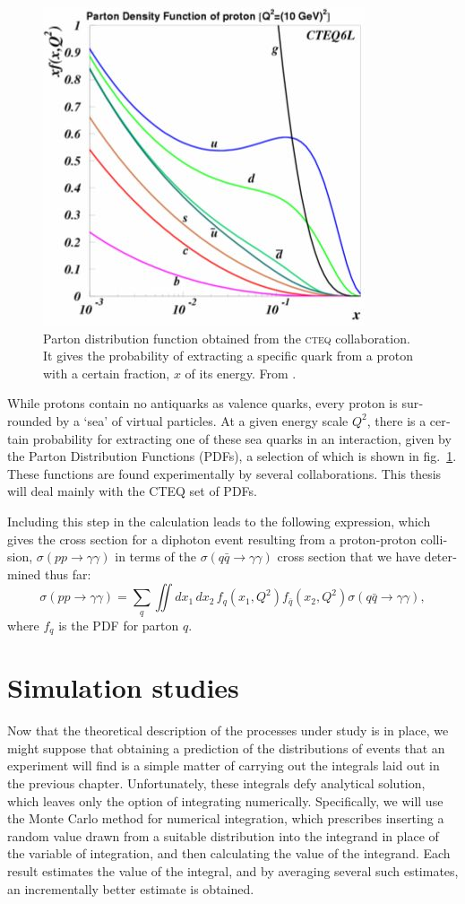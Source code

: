 \begin{english}
\begin{figure}[htp]
\includegraphics[width=.55\textwidth]{pdf}\hfill\parbox[b]{.44\textwidth}{
\caption{Parton distribution function obtained from the \textsc{cteq} collaboration. It gives the probability of extracting a specific quark from a proton with a certain fraction, $x$ of its energy. From \cite{scien2}.\label{pdff}}}
\end{figure}

While protons contain no antiquarks as valence quarks, every proton is surrounded by a `sea' of virtual particles. At a given energy scale $Q^2$, there is a certain probability for extracting one of these sea quarks in an interaction, given by the Parton Distribution Functions (PDFs), a selection of which is shown in fig.~\ref{pdff}. These functions are found experimentally by several collaborations. This thesis will deal mainly with the CTEQ set of PDFs.

Including this step in the calculation leads to the following expression, which gives the cross section for a diphoton event resulting from a proton-proton collision, $\sigma(pp\rightarrow\gamma\gamma)$ in terms of the $\sigma(q\bar q \rightarrow \gamma\gamma)$ cross section that we have determined thus far:
\[\sigma(pp\rightarrow\gamma\gamma)=\sum_q\iint dx_1\,dx_2\,f_q(x_1,Q^2)f_{\bar q}(x_2,Q^2)\sigma(q\bar q\rightarrow\gamma\gamma),\label{pdf}\]
where $f_q$ is the PDF for parton $q$.


\chapter{Simulation studies}\label{ch.mc}

Now that the theoretical description of the processes under study is in place, we might suppose that obtaining a prediction of the distributions of events that an experiment will find is a simple matter of carrying out the integrals laid out in the previous chapter. Unfortunately, these integrals defy analytical solution, which leaves only the option of integrating numerically. Specifically, we will use the Monte Carlo method for numerical integration, which prescribes inserting a random value drawn from a suitable distribution into the integrand in place of the variable of integration, and then calculating the value of the integrand. Each result estimates the value of the integral, and by averaging several such estimates, an incrementally better estimate is obtained.


\end{english}
